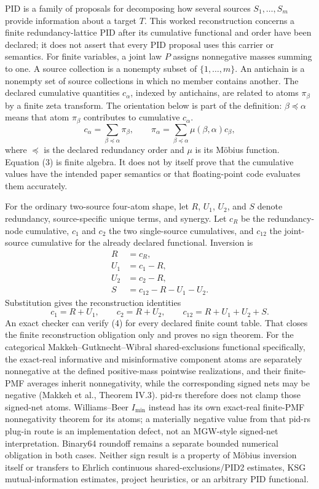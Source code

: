\documentclass[11pt]{article}
\begin{document}
PID is a family of proposals for decomposing how several sources \(S_1,\ldots,S_m\) provide
information about a target \(T\).  This worked reconstruction concerns a finite
redundancy-lattice PID after its cumulative functional and order have been declared; it does not
assert that every PID proposal uses this carrier or semantics.  For finite variables, a joint law
\(P\) assigns nonnegative masses summing to one.  A source collection is a nonempty subset of
\(\{1,\ldots,m\}\).  An antichain is a nonempty set of source collections in which no member
contains another.  The declared cumulative quantities \(c_\alpha\), indexed by antichains, are
related to atoms \(\pi_\beta\) by a finite zeta transform. The orientation below is part of the
definition: \(\beta\preceq\alpha\) means that atom \(\pi_\beta\) contributes to cumulative
\(c_\alpha\).
\[
  c_\alpha=\sum_{\beta\preceq\alpha}\pi_\beta,
  \qquad
  \pi_\alpha=\sum_{\beta\preceq\alpha}
    \mu(\beta,\alpha)c_\beta,
  \tag{3}
\]
where \(\preceq\) is the declared redundancy order and \(\mu\) is its Möbius function.  Equation
(3) is finite algebra.  It does not by itself prove that the cumulative values have the intended
paper semantics or that floating-point code evaluates them accurately.

For the ordinary two-source four-atom shape, let \(R\), \(U_1\), \(U_2\), and \(S\) denote
redundancy, source-specific unique terms, and synergy.  Let \(c_R\) be the redundancy-node
cumulative, \(c_1\) and \(c_2\) the two single-source cumulatives, and \(c_{12}\) the joint-source
cumulative for the already declared functional. Inversion is
\begin{align*}
  R   &=c_R,\\
  U_1 &=c_1-R,\\
  U_2 &=c_2-R,\\
  S   &=c_{12}-R-U_1-U_2.
\end{align*}
Substitution gives the reconstruction identities
\[
  c_1=R+U_1,\qquad
  c_2=R+U_2,\qquad
  c_{12}=R+U_1+U_2+S.
  \tag{4}
\]
An exact checker can verify (4) for every declared finite count table.  That closes the finite
reconstruction obligation only and proves no sign theorem.  For the categorical
Makkeh--Gutknecht--Wibral shared-exclusions functional specifically, the exact-real informative
and misinformative component atoms are separately nonnegative at the defined positive-mass
pointwise realizations, and their finite-PMF averages inherit nonnegativity, while the corresponding
signed nets may be negative (Makkeh et al., Theorem IV.3).  pid-rs therefore does not clamp those
signed-net atoms.
Williams--Beer $I_{\min}$ instead has its own exact-real finite-PMF nonnegativity theorem for its
atoms; a materially negative value from that pid-rs plug-in route is an implementation defect, not
an MGW-style signed-net interpretation.  Binary64 roundoff remains a separate bounded numerical
obligation in both cases.  Neither sign result is a property of Möbius inversion itself or transfers
to Ehrlich continuous shared-exclusions/PID2 estimates, KSG mutual-information estimates, project
heuristics, or an arbitrary PID functional.
\end{document}

